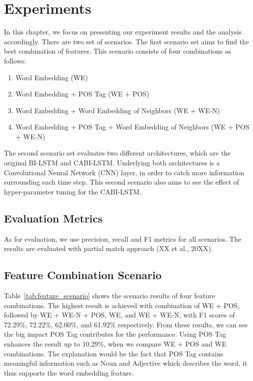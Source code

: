 \section{Experiments}
In this chapter, we focus on presenting our experiment results and the analysis accordingly. There are two set of scenarios. The first scenario set aims to find the best combination of features. This scenario consists of four combinations as follows:

\begin{enumerate}
	\item Word Embedding (WE)
	\item Word Embedding + POS Tag (WE + POS)
	\item Word Embedding + Word Embedding of Neighbors (WE + WE-N)
	\item Word Embedding + POS Tag + Word Embedding of Neighbors (WE + POS + WE-N)
\end{enumerate}

The second scenario set evaluates two different architectures, which are the original BI-LSTM and CABI-LSTM. Underlying both architectures is a Convolutional Neural Network (CNN) layer, in order to catch more information surrounding each time step. This second scenario also aims to see the effect of hyper-parameter tuning for the CABI-LSTM.

\subsection{Evaluation Metrics}
As for evaluation, we use precision, recall and F1 metrics for all scenarios. The results are evaluated with partial match approach (XX et al., 20XX).

\subsection{Feature Combination Scenario}
Table~\ref{tab:feature_scenario} shows the scenario results of four feature combinations. The highest result is achieved with combination of WE + POS, followed by WE + WE-N + POS, WE, and WE + WE-N, with F1 scores of 72.29\%, 72.22\%, 62.00\%, and 61.92\% respectively. From these results, we can see the big impact POS Tag contributes for the performance. Using POS Tag enhances the result up to 10.29\%, when we compare WE + POS and WE combinations. The explanation would be the fact that POS Tag contains meaningful information such as Noun and Adjective which describes the word, it thus supports the word embedding feature.

